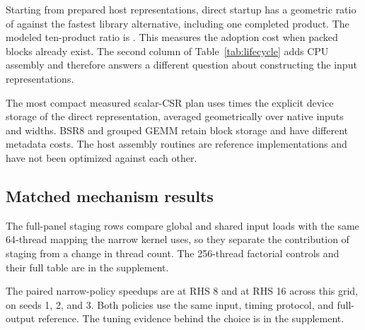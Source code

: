 \documentclass[10pt]{article}
\begin{document}
\begin{table}[!htbp]
\centering\small
\caption{Explicit device-array storage ranges over native inputs and
panel widths, and geometric mean synchronized startup time including one
product. Storage excludes dense panels and opaque library allocations.}
\label{tab:storage}

\end{table}

Starting from prepared host representations, direct startup has a geometric
ratio of \NativeStartupRatio{} against the fastest library alternative,
including one completed product. The modeled ten-product ratio is
\NativeTenProductsRatio{}. This measures the adoption cost when packed
blocks already exist. The second column of Table~\ref{tab:lifecycle} adds
CPU assembly and therefore answers a different question about constructing
the input representations.

The most compact measured scalar-CSR plan uses \NativeCsrStorageRatio{}
times the explicit device storage of the direct representation, averaged
geometrically over native inputs and widths. BSR8 and grouped GEMM retain
block storage and have different metadata costs. The host assembly routines
are reference implementations and have not been optimized against each other.

\subsection{Matched mechanism results}\label{sec:matched-results}


The full-panel staging rows compare global and shared input loads with the
same 64-thread mapping the narrow kernel uses, so they separate the
contribution of staging from a change in thread count. The 256-thread
factorial controls and their full table are in the supplement.

\begin{table}[!htbp]
\centering\small
\caption{Previous narrow-policy time divided by final direct time, measured
in the same process. Each row includes two degrees, two shape distributions,
three matrix seeds, and three processes per seed. Ranges first average the
three processes for each matrix instance.}\label{tab:kernel-upgrade}

\end{table}

The paired narrow-policy speedups are \RhsEightUpgrade{} at RHS 8 and
\RhsSixteenUpgrade{} at RHS 16 across this grid, on seeds 1, 2, and 3. Both
policies use the same input, timing protocol, and full-output reference.
The tuning evidence behind the choice is in the supplement.
\end{document}
